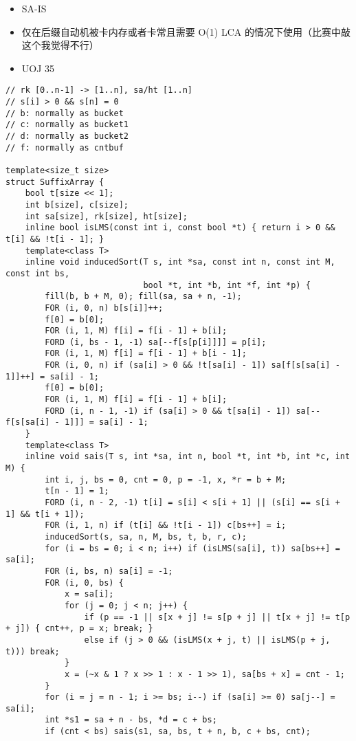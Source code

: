 \documentclass[]{article}
\providecommand{\tightlist}{%
  \setlength{\itemsep}{0pt}\setlength{\parskip}{0pt}}
\begin{document}
\begin{itemize}
\tightlist
\item
  SA-IS
\item
  仅在后缀自动机被卡内存或者卡常且需要 O(1) LCA
  的情况下使用（比赛中敲这个我觉得不行）
\item
  UOJ 35
\end{itemize}

\begin{verbatim}
// rk [0..n-1] -> [1..n], sa/ht [1..n]
// s[i] > 0 && s[n] = 0
// b: normally as bucket
// c: normally as bucket1
// d: normally as bucket2
// f: normally as cntbuf

template<size_t size>
struct SuffixArray {
    bool t[size << 1];
    int b[size], c[size];
    int sa[size], rk[size], ht[size];
    inline bool isLMS(const int i, const bool *t) { return i > 0 && t[i] && !t[i - 1]; }
    template<class T>
    inline void inducedSort(T s, int *sa, const int n, const int M, const int bs,
                            bool *t, int *b, int *f, int *p) {
        fill(b, b + M, 0); fill(sa, sa + n, -1);
        FOR (i, 0, n) b[s[i]]++;
        f[0] = b[0];
        FOR (i, 1, M) f[i] = f[i - 1] + b[i];
        FORD (i, bs - 1, -1) sa[--f[s[p[i]]]] = p[i];
        FOR (i, 1, M) f[i] = f[i - 1] + b[i - 1];
        FOR (i, 0, n) if (sa[i] > 0 && !t[sa[i] - 1]) sa[f[s[sa[i] - 1]]++] = sa[i] - 1;
        f[0] = b[0];
        FOR (i, 1, M) f[i] = f[i - 1] + b[i];
        FORD (i, n - 1, -1) if (sa[i] > 0 && t[sa[i] - 1]) sa[--f[s[sa[i] - 1]]] = sa[i] - 1;
    }
    template<class T>
    inline void sais(T s, int *sa, int n, bool *t, int *b, int *c, int M) {
        int i, j, bs = 0, cnt = 0, p = -1, x, *r = b + M;
        t[n - 1] = 1;
        FORD (i, n - 2, -1) t[i] = s[i] < s[i + 1] || (s[i] == s[i + 1] && t[i + 1]);
        FOR (i, 1, n) if (t[i] && !t[i - 1]) c[bs++] = i;
        inducedSort(s, sa, n, M, bs, t, b, r, c);
        for (i = bs = 0; i < n; i++) if (isLMS(sa[i], t)) sa[bs++] = sa[i];
        FOR (i, bs, n) sa[i] = -1;
        FOR (i, 0, bs) {
            x = sa[i];
            for (j = 0; j < n; j++) {
                if (p == -1 || s[x + j] != s[p + j] || t[x + j] != t[p + j]) { cnt++, p = x; break; }
                else if (j > 0 && (isLMS(x + j, t) || isLMS(p + j, t))) break;
            }
            x = (~x & 1 ? x >> 1 : x - 1 >> 1), sa[bs + x] = cnt - 1;
        }
        for (i = j = n - 1; i >= bs; i--) if (sa[i] >= 0) sa[j--] = sa[i];
        int *s1 = sa + n - bs, *d = c + bs;
        if (cnt < bs) sais(s1, sa, bs, t + n, b, c + bs, cnt);

\end{verbatim}
\end{document}
